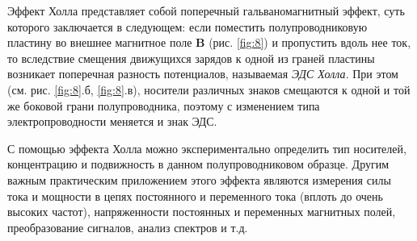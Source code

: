 \documentclass[a4paper,14pt]{extarticle}
\renewcommand{\vec}{\mathbf} %
\begin{document}
Эффект Холла представляет собой поперечный гальваномагнитный эффект, суть которого заключается в следующем: если поместить полупроводниковую пластину во внешнее магнитное поле $\vec{B}$ (рис. \ref{fig:8}) и пропустить вдоль нее ток, то вследствие смещения движущихся зарядов к одной из граней пластины возникает поперечная разность потенциалов, называемая \textit{ЭДС Холла}. При этом (см. рис. \ref{fig:8}.б, \ref{fig:8}.в), носители различных знаков смещаются к одной и той же боковой грани полупроводника, поэтому с изменением типа электропроводности меняется и знак ЭДС.

С помощью эффекта Холла можно экспериментально определить тип носителей, концентрацию и подвижность в данном полупроводниковом образце. Другим важным практическим приложением этого эффекта являются измерения силы тока и мощности в цепях постоянного и переменного тока  (вплоть до очень высоких частот), напряженности постоянных и переменных магнитных полей, преобразование сигналов, анализ спектров и т.д.
\end{document}
